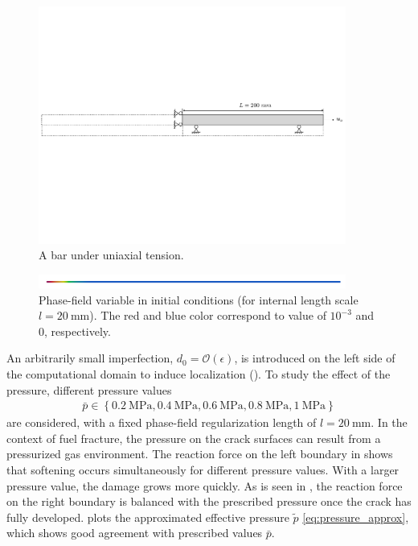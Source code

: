 \begin{figure}[!ht]
  \centering
  \includegraphics[width=0.9\textwidth,trim={0 8cm 0 8cm},clip]{Chapter3/figures/bar}
  \caption{A bar under uniaxial tension.}
  \label{fig:bar}
\end{figure}

\begin{figure}[!ht]
  \centering
  \includegraphics[width=0.9\textwidth]{Chapter3/figures/bar_c}
  \caption{Phase-field variable in initial conditions (for internal length scale $l=\SI{20}{\milli\meter}$). The red and blue color correspond to value of $10^{-3}$ and 0, respectively.}
  \label{fig:bar_c}
\end{figure}

An arbitrarily small imperfection, $d_0 = \mathcal{O}(\epsilon)$, is introduced on the left side of the computational domain to induce localization ().
To study the effect of the pressure, different pressure values
\begin{align*}
  \bar{p} \in \left\{ \SI{0.2}{\mega\pascal}, \SI{0.4}{\mega\pascal}, \SI{0.6}{\mega\pascal}, \SI{0.8}{\mega\pascal}, \SI{1}{\mega\pascal} \right\}
\end{align*}
are considered, with a fixed phase-field regularization length of $l = \SI{20}{\milli\meter}$. In the context of fuel fracture, the pressure on the crack surfaces can result from a pressurized gas environment. The reaction force on the left boundary in  shows that softening occurs simultaneously for different pressure values. With a larger pressure value, the damage grows more quickly.
As is seen in , the reaction force on the right boundary is balanced with the prescribed pressure once the crack has fully developed.  plots the approximated effective pressure $\widetilde{p}$ \eqref{eq:pressure_approx}, which shows good agreement with prescribed values $\bar{p}$.

